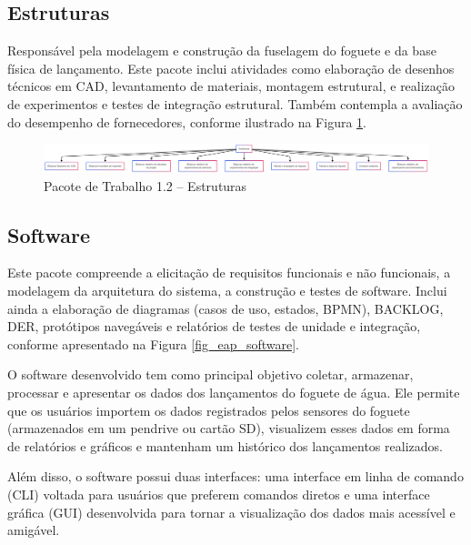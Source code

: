
\subsection{Estruturas}

Responsável pela modelagem e construção da fuselagem do foguete e da base física de lançamento. Este pacote inclui atividades como elaboração de desenhos técnicos em CAD, levantamento de materiais, montagem estrutural, e realização de experimentos e testes de integração estrutural. Também contempla a avaliação do desempenho de fornecedores, conforme ilustrado na Figura \ref{fig_eap_estruturas}.

\begin{figure}[!h]
	\centering
\includegraphics[width=15cm]{figuras/eap_estruturas.png}
	\caption{Pacote de Trabalho 1.2 – Estruturas}
	\label{fig_eap_estruturas} 
\end{figure}


\subsection{Software}

Este pacote compreende a elicitação de requisitos funcionais e não funcionais, a modelagem da arquitetura do sistema, a construção e testes de software. Inclui ainda a elaboração de diagramas (casos de uso, estados, BPMN), BACKLOG, DER, protótipos navegáveis e relatórios de testes de unidade e integração, conforme apresentado na Figura \ref{fig_eap_software}.

O software desenvolvido tem como principal objetivo coletar, armazenar, processar e apresentar os dados dos lançamentos do foguete de água. Ele permite que os usuários importem os dados registrados pelos sensores do foguete (armazenados em um pendrive ou cartão SD), visualizem esses dados em forma de relatórios e gráficos e mantenham um histórico dos lançamentos realizados.

Além disso, o software possui duas interfaces: uma interface em linha de comando (CLI) voltada para usuários que preferem comandos diretos e uma interface gráfica (GUI) desenvolvida para tornar a visualização dos dados mais acessível e amigável.

